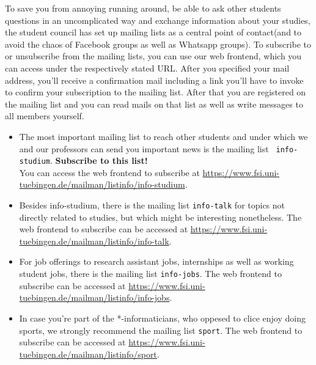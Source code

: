 
To save you from annoying running around, be able to ask other students questions in an uncomplicated way and exchange information about your studies, the student council has set up mailing lists as a central point of contact(and to avoid the chaos of Facebook groups as well as Whatsapp groups).
To subscribe to or unsubscribe from the mailing lists, you can use our web frontend, which you can access under the respectively stated URL. After you specified your mail address, you'll receive a confirmation mail including a link you'll have to invoke to confirm your subscription to the mailing list. After that you are registered on the mailing list and you can read mails on that list as well as write messages to all members yourself.

\begin{itemize}
    \item The most important mailing list to reach other students and under which we and our professors can send you important news is the mailing list \texttt{ info-studium}. \textbf{Subscribe to this list!}\\
You can access the web frontend to subscribe at \url{https://www.fsi.uni-tuebingen.de/mailman/listinfo/info-studium}.
\item Besides info-studium, there is the mailing list \texttt{info-talk} for topics not directly related to studies, but which might be interesting nonetheless. The web frontend to subscribe can be accessed at \url{https://www.fsi.uni-tuebingen.de/mailman/listinfo/info-talk}.
\item For job offerings to research assistant jobs, internships as well as working student jobs, there is the mailing list \texttt{info-jobs}. The web frontend to subscribe can be accessed at \url{https://www.fsi.uni-tuebingen.de/mailman/listinfo/info-jobs}.
\item In case you're part of the *-informaticians, who oppesed to clice enjoy doing sports, we strongly recommend the mailing list \texttt{sport}. The web frontend to subscribe can be accessed at \url{https://www.fsi.uni-tuebingen.de/mailman/listinfo/sport}. 
\end{itemize}
